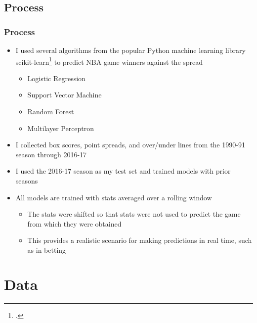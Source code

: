 \documentclass{beamer}
\begin{document}
\subsection{Process}
\begin{frame}
\frametitle{Process}
\begin{itemize}
    \item I used several algorithms from the popular Python machine learning library scikit-learn\footcite{scikit-learn} to predict NBA game winners against the spread
    \begin{itemize}
        \item Logistic Regression
        \item Support Vector Machine
        \item Random Forest
        \item Multilayer Perceptron
    \end{itemize}
    \item I collected box scores, point spreads, and over/under lines from the 1990-91 season through 2016-17
    \item I used the 2016-17 season as my test set and trained models with prior seasons
    \item All models are trained with stats averaged over a rolling window
    \begin{itemize}
        \item The stats were shifted so that stats were not used to predict the game from which they were obtained
        \item This provides a realistic scenario for making predictions in real time, such as in betting
    \end{itemize}
\end{itemize}
\end{frame}

\section{Data}
\end{document}
